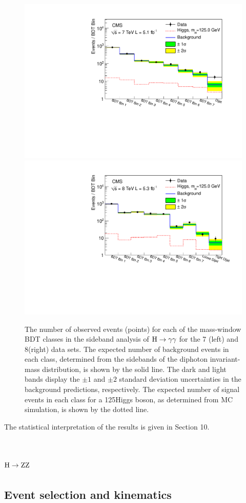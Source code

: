 \documentclass[11pt,twoside,a4paper,cmspaper,final,collab]{cms-tdr}
\begin{document}
\begin{figure}[htbp]
  \begin{center}
    \includegraphics[width=0.49\linewidth]{figures/hgg_MassWindow_model_m125}
    \includegraphics[width=0.49\linewidth]{figures/hgg_MassWindow_model_m125_8TeV}
    \caption{The number of observed events (points) for each of the mass-window BDT classes in the sideband analysis of
      $\mathrm{H} \to \gamma\gamma$ for the 7 (left) and 8\TeV (right) data sets. The expected number of background events in
       each class, determined from the sidebands of the diphoton invariant-mass distribution, is shown by the solid line.
         The dark and light bands display the ${\pm}1$ and ${\pm}2$ standard deviation uncertainties in the background predictions,
         respectively. The expected number of signal events in each class for a 125\GeV Higgs boson, as determined from MC simulation,
         is shown by the dotted line.
    }
    \label{fig:hgg_MassWindowModel}
  \end{center}
\end{figure}

The statistical interpretation of the results is given in Section 10.










\section{\texorpdfstring{$\mathrm{H}\to\mathrm{Z}\mathrm{Z}$}{H to ZZ}\label{sec:hzz4l}}
\subsection{Event selection and kinematics}
\end{document}
